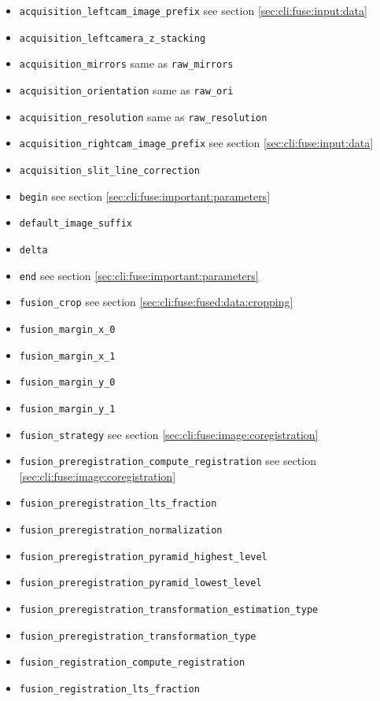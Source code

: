 \begin{itemize}
\item \texttt{acquisition\_leftcam\_image\_prefix}  see section \ref{sec:cli:fuse:input:data}
\item \texttt{acquisition\_leftcamera\_z\_stacking}
\item \texttt{acquisition\_mirrors} same as \texttt{raw\_mirrors}
\item \texttt{acquisition\_orientation} same as \texttt{raw\_ori}
\item \texttt{acquisition\_resolution} same as \texttt{raw\_resolution}
\item \texttt{acquisition\_rightcam\_image\_prefix}  see section \ref{sec:cli:fuse:input:data}
\item \texttt{acquisition\_slit\_line\_correction}
\item \texttt{begin} see section \ref{sec:cli:fuse:important:parameters}
\item \texttt{default\_image\_suffix}
\item \texttt{delta}
\item \texttt{end} see section \ref{sec:cli:fuse:important:parameters}
\item \texttt{fusion\_crop} see section \ref{sec:cli:fuse:fused:data:cropping}
\item \texttt{fusion\_margin\_x\_0}
\item \texttt{fusion\_margin\_x\_1}
\item \texttt{fusion\_margin\_y\_0}
\item \texttt{fusion\_margin\_y\_1}
\item \texttt{fusion\_strategy}  see section \ref{sec:cli:fuse:image:coregistration}
\item \texttt{fusion\_preregistration\_compute\_registration} see section \ref{sec:cli:fuse:image:coregistration}
\item \texttt{fusion\_preregistration\_lts\_fraction}
\item \texttt{fusion\_preregistration\_normalization}
\item \texttt{fusion\_preregistration\_pyramid\_highest\_level}
\item \texttt{fusion\_preregistration\_pyramid\_lowest\_level}
\item \texttt{fusion\_preregistration\_transformation\_estimation\_type}
\item \texttt{fusion\_preregistration\_transformation\_type}
\item \texttt{fusion\_registration\_compute\_registration}
\item \texttt{fusion\_registration\_lts\_fraction}

\end{itemize}

